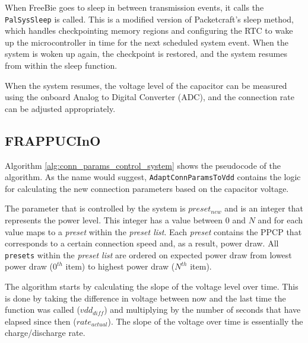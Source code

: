 When FreeBie goes to sleep in between transmission events, it calls the \texttt{PalSysSleep} is called. This is a modified version of Packetcraft's sleep method, which handles checkpointing memory regions and configuring the RTC to wake up the microcontroller in time for the next scheduled system event. When the system is woken up again, the checkpoint is restored, and the system resumes from within the sleep function. 

When the system resumes, the voltage level of the capacitor can be measured using the onboard Analog to Digital Converter (ADC), and the connection rate can be adjusted appropriately. 

\subsection{FRAPPUCInO}
Algorithm \ref{alg:conn_params_control_system} shows the pseudocode of the algorithm. As the name would suggest, \texttt{AdaptConnParamsToVdd} contains the logic for calculating the new connection parameters based on the capacitor voltage. 

The parameter that is controlled by the system is $preset_{new}$ and is an integer that represents the power level. This integer has a value between $0$ and $N$ and for each value maps to a \textit{preset} within the \textit{preset list}. Each \textit{preset} contains the PPCP that corresponds to a certain connection speed and, as a result, power draw. All \texttt{presets} within the \textit{preset list} are ordered on expected power draw from lowest power draw ($0^{th}$ item) to highest power draw ($N^{th}$ item).

The algorithm starts by calculating the slope of the voltage level over time. This is done by taking the difference in voltage between now and the last time the function was called ($vdd_{diff}$) and multiplying by the number of seconds that have elapsed since then ($rate_{actual}$). The slope of the voltage over time is essentially the charge/discharge rate.

